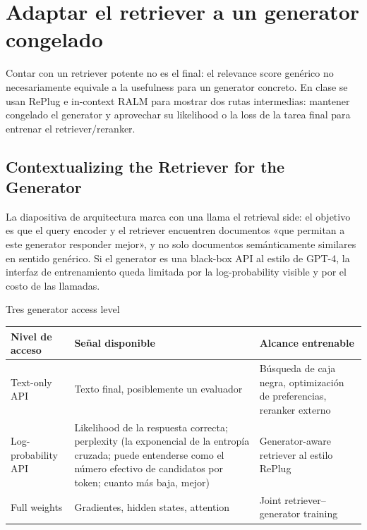\section{Adaptar el retriever a un generator congelado}

Contar con un retriever potente no es el final: el relevance score genérico no necesariamente equivale a la usefulness para un generator concreto. En clase se usan RePlug e in-context RALM para mostrar dos rutas intermedias: mantener congelado el generator y aprovechar su likelihood o la loss de la tarea final para entrenar el retriever/reranker.

\subsection{Contextualizing the Retriever for the Generator}

La diapositiva de arquitectura marca con una llama el retrieval side: el objetivo es que el query encoder y el retriever encuentren documentos «que permitan a este generator responder mejor», y no solo documentos semánticamente similares en sentido genérico. Si el generator es una black-box API al estilo de GPT-4, la interfaz de entrenamiento queda limitada por la log-probability visible y por el costo de las llamadas.


\begin{knowledgebox}{Tres generator access level}
\begin{tabularx}{\textwidth}{L{0.22\textwidth}>{\raggedright\arraybackslash}X >{\raggedright\arraybackslash}X}
\toprule
Nivel de acceso & Señal disponible & Alcance entrenable \\
\midrule
Text-only API & Texto final, posiblemente un evaluador & Búsqueda de caja negra, optimización de preferencias, reranker externo \\
Log-probability API & Likelihood de la respuesta correcta; perplexity (la exponencial de la entropía cruzada; puede entenderse como el número efectivo de candidatos por token; cuanto más baja, mejor) & Generator-aware retriever al estilo RePlug \\
Full weights & Gradientes, hidden states, attention & Joint retriever--generator training \\
\bottomrule
\end{tabularx}
\end{knowledgebox}

